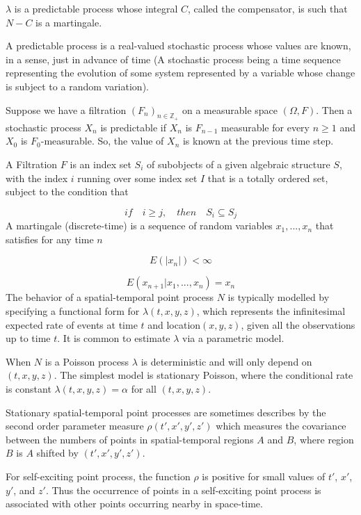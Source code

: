 \documentclass[11pt,a4paper]{article}
\begin{document}
$\lambda$ is a predictable process whose integral $C$, called the compensator, is such that $ N - C $ is a martingale.

A predictable process is a real-valued stochastic process whose values are known, in a sense, just in advance of time (A stochastic process being a time sequence representing the evolution of some system represented by a variable whose change is subject to a random variation). 

Suppose we have a filtration $(F_{n})_{n \in \mathbb{Z}_{+}}$ on a measurable space $(\Omega, F)$. Then a stochastic process $X_{n}$ is predictable if $X_{n}$ is $F_{n-1}$ measurable for every $n \geq 1$ and $X_{0}$ is $F_{0}$-measurable. So, the value of $X_{n}$ is known at the previous time step.

A Filtration $F$ is an index set $S_{i}$ of subobjects of a given algebraic structure $S$, with the index $i$ running over some index set $I$ that is a totally ordered set, subject to the condition that 

\[
if  \quad  i \geq j, \quad then \quad  S_{i} \subseteq S_{j}
\] 
A martingale (discrete-time) is a sequence of random variables $x_{1}, ... , x_{n}$ that satisfies for any time $n$

\[
E(|x_{n}|) < \infty
\]

\[
E(x_{n+1} | x_{1}, ... , x_{n}) = x_{n}
\]
The behavior of a spatial-temporal point process $N$ is typically modelled by specifying a functional form for $\lambda(t,x,y,z)$, which represents the infinitesimal expected rate of events at time $t$ and location$(x,y,z)$, given all the observations up to time $t$. It is common to estimate $\lambda$ via a parametric model.

When $N$ is a Poisson process $\lambda$ is deterministic and will only depend on $(t,x,y,z)$. The simplest model is stationary Poisson, where the conditional rate is constant $\lambda(t,x,y,z)=\alpha$ for all $(t,x,y,z)$.

Stationary spatial-temporal point processes are sometimes describes by the second order parameter measure $\rho(t', x', y', z')$ which measures the covariance between the numbers of points in spatial-temporal regions $A$ and $B$, where region $B$ is $A$ shifted by $(t', x', y', z')$.

For self-exciting point process, the function $\rho$ is positive for small values of $t'$, $x'$, $y'$, and $z'$. Thus the occurrence of points in a self-exciting point process is associated with other points occurring nearby in space-time.
\end{document}
